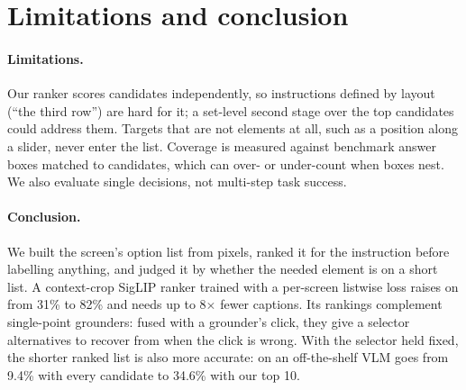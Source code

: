\section{Limitations and conclusion}
\label{sec:conclusion}

\paragraph{Limitations.}
Our ranker scores candidates independently, so instructions defined by layout (``the third row'') are hard for it;
a set-level second stage over the top candidates could address them. Targets that are not elements at all, such as
a position along a slider, never enter the list. Coverage is measured against benchmark answer boxes matched to
candidates, which can over- or under-count when boxes nest. We also evaluate single decisions, not multi-step task
success.

\paragraph{Conclusion.}
We built the screen's option list from pixels, ranked it for the instruction before labelling anything, and judged
it by whether the needed element is on a short list. A context-crop SigLIP ranker trained with a per-screen
listwise loss raises  on \sspro from 31\% to 82\% and needs up to 8$\times$ fewer captions. Its rankings
complement single-point grounders: fused with a grounder's click, they give a selector alternatives to recover from
when the click is wrong. With the selector held fixed, the shorter ranked list is also more accurate: on \sspro an
off-the-shelf VLM goes from 9.4\% with every candidate to 34.6\% with our top 10.
